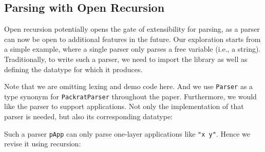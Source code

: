 

\subsection{Parsing with Open Recursion}\label{subsec:parsingwithopen}
Open recursion potentially opens the gate of extensibility for parsing, as a parser can now be open to additional features in the future.
Our exploration starts from a simple example, where a single parser only parses a free variable (i.e., a string). Traditionally, to write
such a parser, we need to import the library as
well as defining the datatype for which it produces.


Note that we are omitting lexing and demo code here. And we use \lstinline{Parser} as a type synonym for \lstinline{PackratParser} throughout the paper. Furthermore, we would like the parser to support applications.
Not only the implementation of that parser is needed, but also its corresponding datatype:


Such a parser \lstinline{pApp} can only parse one-layer applications like \lstinline{"x y"}. Hence we revise it using recursion:


